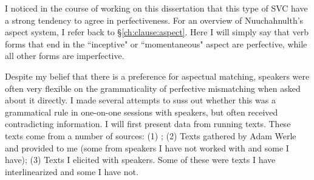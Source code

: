 \begin{comment}
\begin{tikzpicture}[sibling distance=10em,
  every node/.style = {shape=rectangle, align=center}]
\node (aspect) at (0,10) {aspect};
\node (pf) at (1,15) {perfective};
\node (impf) at (1,5) {imperfective};
\node (mo) at (8,15) {momentaneous};
\node (in) at (8,14) {inceptive};
\node (mo-grad-pf) at (8,13) {momentaneous-graduative-perf};
\node (in-grad-pf) at (8,12) {incep-grad-perf};
\node (dr-pf) at (8,11) {durative-perf};
\node (dr-grad-pf) at (8,10) {durative-grad-pf};
\node (rp-pf) at (8,9) {repet-perf};
\node (it-pf) at (8,8) {iter-perf};
\node (ct) at (5,6) {continuative};
\node (dr) at (5,5) {durative};
\node (rp) at (5,4) {repetative};
\node (it) at (5,3) {iterative};
\node (mo-grad) at (5,2) {mo-grad-pf};
\node (in-grad) at (5,1) {in-grad-pf};
\node (dr-grad) at (5,0) {dr-grad-pf};
\draw[->] (aspect) -- (pf);
\draw[->] (aspect) -- (impf);
\draw[->] (pf) -- (mo);
\draw[->] (pf) -- (in);
\draw[->] (pf) -- (mo-grad-pf);
\draw[->] (pf) -- (in-grad-pf);
\draw[->] (pf) -- (dr-pf);
\draw[->] (pf) -- (dr-grad-pf);
\draw[->] (pf) -- (rp-pf);
\draw[->] (pf) -- (it-pf);
\draw[->] (impf) -- (ct);
\draw[->] (impf) -- (dr);
\draw[->] (impf) -- (rp);
\draw[->] (impf) -- (it);
\draw[->] (impf) -- (mo-grad);
\draw[->] (impf) -- (in-grad);
\draw[->] (impf) -- (dr-grad);
\end{tikzpicture}
\end{comment}


I noticed in the course of working on this dissertation that this type of SVC have a strong tendency to agree in perfectiveness. For an overview of Nuuchahnulth's aspect system, I refer back to \S\ref{ch:clause:aspect}. Here I will simply say that verb forms that end in the ``inceptive" or ``momentaneous" aspect are perfective, while all other forms are imperfective.

Despite my belief that there is a preference for aspectual matching, speakers were often very flexible on the grammaticality of perfective mismatching when asked about it directly. I made several attempts to suss out whether this was a grammatical rule in one-on-one sessions with speakers, but often received contradicting information. I will first present data from running texts. These texts come from a number of sources: (1) \cite{sapir1939}; (2) Texts gathered by Adam Werle and provided to me (some from speakers I have not worked with and some I have); (3) Texts I elicited with speakers. Some of these were texts I have interlinearized and some I have not.

